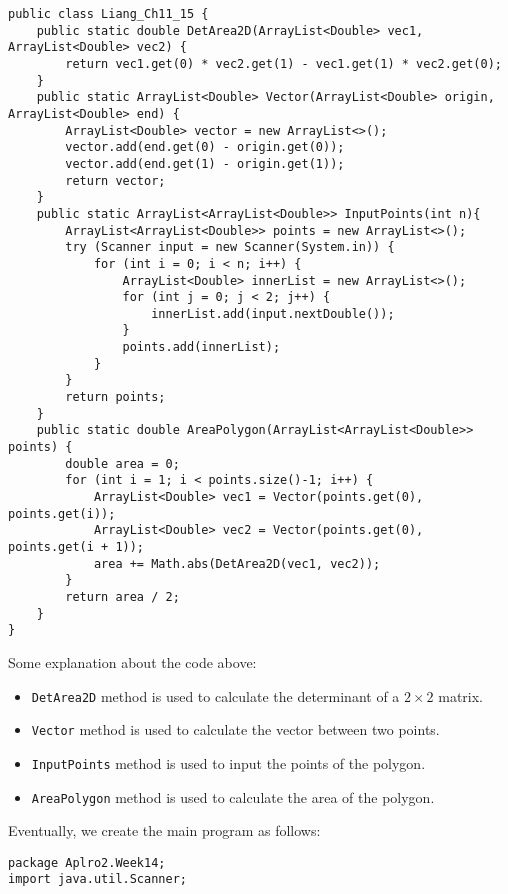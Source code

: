 \documentclass{article}
\begin{document}
\begin{enumerate}
\begin{lstlisting}[backgroundcolor=\color{bg}]
public class Liang_Ch11_15 {
    public static double DetArea2D(ArrayList<Double> vec1, ArrayList<Double> vec2) {
        return vec1.get(0) * vec2.get(1) - vec1.get(1) * vec2.get(0);
    }
    public static ArrayList<Double> Vector(ArrayList<Double> origin, ArrayList<Double> end) {
        ArrayList<Double> vector = new ArrayList<>();
        vector.add(end.get(0) - origin.get(0));
        vector.add(end.get(1) - origin.get(1));
        return vector;
    }
    public static ArrayList<ArrayList<Double>> InputPoints(int n){
        ArrayList<ArrayList<Double>> points = new ArrayList<>();
        try (Scanner input = new Scanner(System.in)) {
            for (int i = 0; i < n; i++) {
                ArrayList<Double> innerList = new ArrayList<>();
                for (int j = 0; j < 2; j++) {
                    innerList.add(input.nextDouble());
                }
                points.add(innerList);
            }
        }
        return points;
    }
    public static double AreaPolygon(ArrayList<ArrayList<Double>> points) {
        double area = 0;
        for (int i = 1; i < points.size()-1; i++) {
            ArrayList<Double> vec1 = Vector(points.get(0), points.get(i));
            ArrayList<Double> vec2 = Vector(points.get(0), points.get(i + 1));
            area += Math.abs(DetArea2D(vec1, vec2));
        }
        return area / 2;
    }
}
        \end{lstlisting}
        Some explanation about the code above:
        \begin{itemize}
            \item \texttt{DetArea2D} method is used to calculate the determinant of a $2\times 2$ matrix.
            \item \texttt{Vector} method is used to calculate the vector between two points.
            \item \texttt{InputPoints} method is used to input the points of the polygon.
            \item \texttt{AreaPolygon} method is used to calculate the area of the polygon.
        \end{itemize}
        Eventually, we create the main program as follows:
        \begin{lstlisting}[backgroundcolor=\color{bg}]
package Aplro2.Week14;
import java.util.Scanner;


\end{lstlisting}
\end{enumerate}
\end{document}
